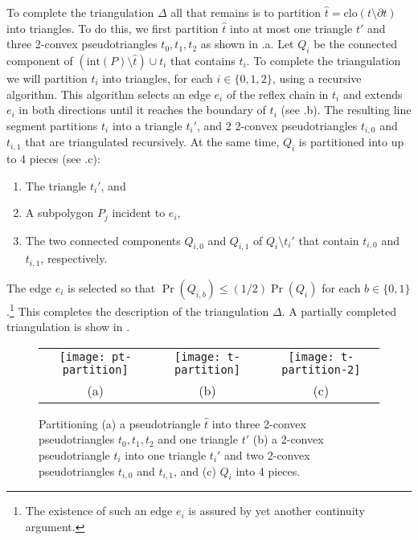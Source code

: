 \documentclass[lotsofwhite]{patmorin}
\newcommand{\boundary}{\partial}
\newcommand{\closure}{\mathrm{clo}}
\newcommand{\interior}{\mathrm{int}}
\newcommand{\z}[1]{{\hat{#1}}}
\begin{document}
To complete the triangulation $\Delta$ all that remains is to
partition $\z t=\closure(t\setminus \boundary t)$ into triangles.  To
do this, we first partition $\z t$ into at most one triangle $t'$ and
three
2-convex pseudotriangles $t_0,t_1,t_2$ as shown in
.a. Let $Q_i$ be the connected component of
$(\interior(P)\setminus \z t)\cup t_i$ that contains $t_i$.  To
complete the triangulation we will partition $t_i$ into triangles, for
each $i\in\{0,1,2\}$, using a recursive algorithm.  This algorithm
selects an edge $e_i$ of the reflex chain in $t_i$ and extends $e_i$
in both directions until it reaches the boundary of $t_i$ (see
.b).  The resulting line segment partitions $t_i$
into a triangle $t_i'$, and 2 2-convex pseudotriangles $t_{i,0}$ and
$t_{i,1}$ that are triangulated recursively.  At the same time, $Q_i$
is partitioned into up to 4 pieces (see .c):

\begin{enumerate}
\item The triangle $t_i'$, and
\item A subpolygon $P_j$ incident to $e_i$,
\item The two connected components $Q_{i,0}$
and $Q_{i,1}$ of $Q_i\setminus t_i'$ that contain $t_{i,0}$ and
$t_{i,1}$, respectively.
\end{enumerate}
The edge $e_i$ is selected
so that $\Pr(Q_{i,b})\le (1/2)\Pr(Q_i)$ for each
$b\in\{0,1\}$.\footnote{The existence of such an edge $e_i$ is assured
by yet another continuity argument.}  This
completes the description of the triangulation $\Delta$.  A partially
completed triangulation is show in .

\begin{figure}
  \begin{center}
    \begin{tabular}{ccc}
      \texttt{[image: pt-partition]} & 
      \texttt{[image: t-partition]} &
      \texttt{[image: t-partition-2]} \\
      (a) & (b) & (c)
    \end{tabular}
  \end{center}
  \caption{Partitioning (a) a pseudotriangle $\z t$ into three 2-convex
pseudotriangles $t_0,t_1,t_2$ and one triangle $t'$ (b) a 2-convex
pseudotriangle $t_i$ into one triangle $t_i'$ and two 2-convex
pseudotriangles $t_{i,0}$ and $t_{i,1}$, and (c) $Q_i$ into 4 pieces.}
\end{figure}
\end{document}
